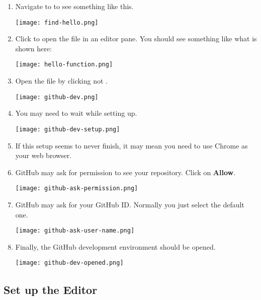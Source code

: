 \begin{enumerate}
\item Navigate to  to see something like this.

\noindent\texttt{[image: find-hello.png]}



\item Click  to open the file in an editor pane.  You
  should see something like what is shown here:

\noindent\texttt{[image: hello-function.png]}


\item Open the file by clicking  not .

\noindent\texttt{[image: github-dev.png]}


\item You may need to wait while setting up.

\noindent\texttt{[image: github-dev-setup.png]}

\item If this setup seems to never finish, it may mean you need to use Chrome as your web browser.


\item GitHub may ask for permission to see your repository.  Click on \textbf{Allow}.
  
\noindent\texttt{[image: github-ask-permission.png]}
  

\item GitHub may ask for your GitHub ID.  Normally you just select the default one.
  
\noindent\texttt{[image: github-ask-user-name.png]}

\item Finally, the GitHub development environment should be opened.
  
\noindent\texttt{[image: github-dev-opened.png]}



\end{enumerate}

\subsection{Set up the Editor}
  
